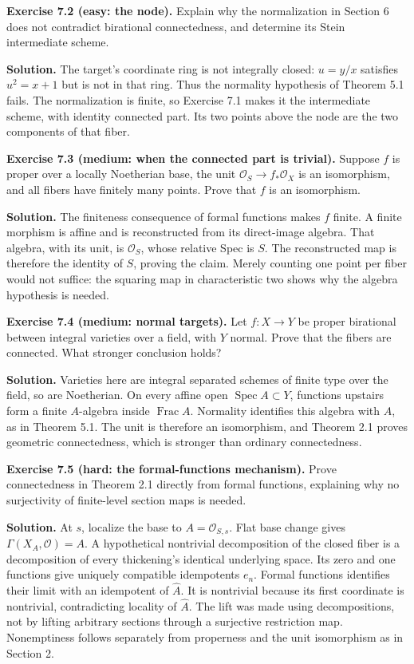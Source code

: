 \documentclass[11pt]{article}
\begin{document}
\textbf{Exercise 7.2 (easy: the node).} Explain why the normalization in
Section 6 does not contradict birational connectedness, and determine
its Stein intermediate scheme.

\textbf{Solution.} The target's coordinate ring is not integrally
closed: \(u=y/x\) satisfies \(u^2=x+1\) but is not in that ring. Thus
the normality hypothesis of Theorem 5.1 fails. The normalization is
finite, so Exercise 7.1 makes it the intermediate scheme, with identity
connected part. Its two points above the node are the two components of
that fiber.

\textbf{Exercise 7.3 (medium: when the connected part is trivial).}
Suppose \(f\) is proper over a locally Noetherian base, the unit
\(\mathcal O_S\to f_*\mathcal O_X\) is an isomorphism, and all fibers
have finitely many points. Prove that \(f\) is an isomorphism.

\textbf{Solution.} The finiteness consequence of formal functions makes
\(f\) finite. A finite morphism is affine and is reconstructed from its
direct-image algebra. That algebra, with its unit, is \(\mathcal O_S\),
whose relative Spec is \(S\). The reconstructed map is therefore the
identity of \(S\), proving the claim. Merely counting one point per
fiber would not suffice: the squaring map in characteristic two shows
why the algebra hypothesis is needed.

\textbf{Exercise 7.4 (medium: normal targets).} Let \(f:X\to Y\) be
proper birational between integral varieties over a field, with \(Y\)
normal. Prove that the fibers are connected. What stronger conclusion
holds?

\textbf{Solution.} Varieties here are integral separated schemes of
finite type over the field, so are Noetherian. On every affine open
\(\operatorname{Spec}A\subset Y\), functions upstairs form a finite
\(A\)-algebra inside \(\operatorname{Frac}A\). Normality identifies this
algebra with \(A\), as in Theorem 5.1. The unit is therefore an
isomorphism, and Theorem 2.1 proves geometric connectedness, which is
stronger than ordinary connectedness.

\textbf{Exercise 7.5 (hard: the formal-functions mechanism).} Prove
connectedness in Theorem 2.1 directly from formal functions, explaining
why no surjectivity of finite-level section maps is needed.

\textbf{Solution.} At \(s\), localize the base to
\(A=\mathcal O_{S,s}\). Flat base change gives
\(\Gamma(X_A,\mathcal O)=A\). A hypothetical nontrivial decomposition of
the closed fiber is a decomposition of every thickening's identical
underlying space. Its zero and one functions give uniquely compatible
idempotents \(e_n\). Formal functions identifies their limit with an
idempotent of \(\widehat A\). It is nontrivial because its first
coordinate is nontrivial, contradicting locality of \(\widehat A\). The
lift was made using decompositions, not by lifting arbitrary sections
through a surjective restriction map. Nonemptiness follows separately
from properness and the unit isomorphism as in Section 2.
\end{document}

